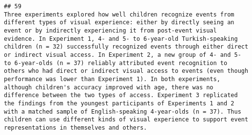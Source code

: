 \documentclass[
  english,
  man]{apa6}
\begin{document}
\begin{verbatim}
## 59                                                                                                                                                                                                                                                                                                                                                                                                                                                                                                                                                                                                                                                                                                                                                                                                                                                                                                                                                                                                                                                                                                                                                                                                                                                                                                                                                                                                                                                                                                                                                                                                                                                      Three experiments explored how well children recognize events from different types of visual experience: either by directly seeing an event or by indirectly experiencing it from post-event visual evidence. In Experiment 1, 4- and 5- to 6-year-old Turkish-speaking children (n = 32) successfully recognized events through either direct or indirect visual access. In Experiment 2, a new group of 4- and 5- to 6-year-olds (n = 37) reliably attributed event recognition to others who had direct or indirect visual access to events (even though performance was lower than Experiment 1). In both experiments, although children's accuracy improved with age, there was no difference between the two types of access. Experiment 3 replicated the findings from the youngest participants of Experiments 1 and 2 with a matched sample of English-speaking 4-year-olds (n = 37). Thus children can use different kinds of visual experience to support event representations in themselves and others.

\end{verbatim}
\end{document}
